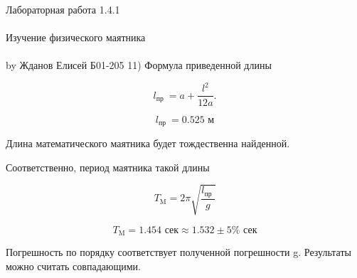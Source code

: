 \documentclass{astroedu-lab}
\begin{document}
\begin{problem}{\huge Лабораторная работа 1.4.1\\\\Изучение физического маятника\\\\by Жданов Елисей Б01-205}
11) Формула приведенной длины

\[
l_{\text {пр }}=a + \frac{l^{2}}{12 a} .
\]

\begin{equation}
	l_{\text {пр }} = 0.525 \text{ м}
\end{equation}

Длина математического маятника будет тождественна найденной.

Соответственно, период маятника такой длины

	\[
T_{\mathrm{M}}=2 \pi \sqrt{\frac{l_{\text {пр }}}{g}}
\]

\begin{equation}
	T_{\mathrm{M}} = 1.454\text{ сек} \approx 1.532 \pm 5\%\text{ сек}
\end{equation}

Погрешность по порядку соответствует полученной погрешности g. Результаты можно считать совпадающими.




\end{problem}
\end{document}
